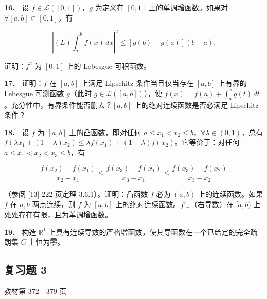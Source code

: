 \documentclass[11pt,a4paper]{article}
\begin{document}
\par{}\noindent \textbf{16.}　设 \(f\in\mathcal L([0,1])\)，\(g\) 为定义在 \([0,1]\) 上的单调增函数。如果对 \(\forall[a,b]\subset[0,1]\)，有

\[
\left|(L)\int_a^b f(x)\,dx\right|^2\le[g(b)-g(a)](b-a).
\]

证明：\(f^2\) 为 \([0,1]\) 上的 Lebesgue 可积函数。

\par{}\noindent \textbf{17.}　证明：\(f\) 在 \([a,b]\) 上满足 Lipschitz 条件当且仅当存在 \([a,b]\) 上有界的 Lebesgue 可测函数 \(g\)（此时 \(g\in\mathcal L([a,b])\)），使 \(f(x)=f(a)+\int_a^x g(t)\,dt\)。充分性中，有界条件能否删去？\([a,b]\) 上的绝对连续函数是否必满足 Lipschitz 条件？

\par{}\noindent \textbf{18.}　设 \(f\) 为 \([a,b]\) 上的凸函数，即对任何 \(a\le x_1<x_2\le b\)，\(\forall\lambda\in(0,1)\)，总有 \(f(\lambda x_1+(1-\lambda)x_2)\le\lambda f(x_1)+(1-\lambda)f(x_2)\)。它等价于：对任何 \(a\le x_1<x_2<x_3\le b\)，有

\[
\frac{f(x_2)-f(x_1)}{x_2-x_1}\le\frac{f(x_3)-f(x_1)}{x_3-x_1}\le\frac{f(x_3)-f(x_2)}{x_3-x_2}
\]

（参阅 {[}13{]} 222 页定理 3.6.1）。证明：凸函数 \(f\) 必为 \((a,b)\) 上的连续函数。如果 \(f\) 在 \(a,b\) 两点连续，则 \(f\) 为 \([a,b]\) 上的绝对连续函数。\(f'_+\)（右导数）在 \([a,b)\) 上处处存在有限，且为单调增函数。

\par{}\noindent \textbf{19.}　构造 \(\mathbb R^1\) 上具有连续导数的严格增函数，使其导函数在一个已给定的完全疏朗集 \(C\) 上恒为零。


\hypertarget{exr}{}\subsection*{复习题 3}
\noindent 教材第 372—379 页
\end{document}
